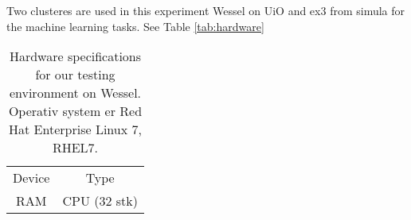 
Two clusteres are used in this experiment Wessel on UiO and ex3 from simula for the machine learning tasks. See Table
\ref{tab:hardware}
\begin{table}[ht]
    \centering
    \begin{tabular}{c|c}
        Device &  Type  \\
        RAM  & 
        CPU (32 stk)  &
    \end{tabular}
    \caption{Hardware specifications for our testing environment on Wessel. Operativ system er Red Hat Enterprise Linux 7, RHEL7.}
    \label{tab:hardware_wessel}
\end{table}




